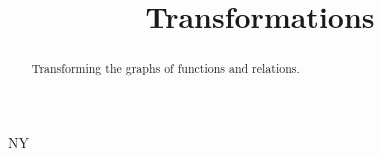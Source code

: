 \documentclass{ximera}
\title{Transformations}
\begin{document}
\begin{abstract}
Transforming the graphs of functions and relations.
\end{abstract}
\maketitle

NY
\end{document}
